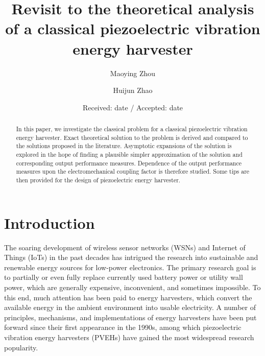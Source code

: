 \documentclass{svjour3}                     %
\begin{document}
\title{Revisit to the theoretical analysis of a classical piezoelectric vibration energy harvester }

\author{Maoying Zhou         \and
        Huijun Zhao %
}



\date{Received: date / Accepted: date}


\maketitle

\begin{abstract}
In this paper, we investigate the classical problem for a classical piezoelectric vibration energy harvester. Exact theoretical solution to the problem is derived and compared to the solutions proposed in the literature. Asymptotic expansions of the solution is explored in the hope of finding a plausible simpler approximation of the solution and corresponding output performance measures. Dependence of the output performance measures upon the electromechanical coupling factor is therefore studied. Some tips are then provided for the design of piezoelectric energy harvester.

\end{abstract}

\section{Introduction}

The soaring development of wireless sensor networks (WSNs) and Internet of Things (IoTs) in the past decades has intrigued the research into sustainable and renewable energy sources for low-power electronics. The primary research goal is to partially or even fully replace currently used battery power or utility wall power, which are generally expensive, inconvenient, and sometimes impossible. To this end, much attention has been paid to energy harvesters, which convert the available energy in the ambient environment into usable electricity. A number of principles, mechanisms, and implementations of energy harvesters have been put forward since their first appearance in the 1990s, \cite{beeby2006energy,anton2007review,zhou2018review,safaei2019review} among which piezoelectric vibration energy harvesters (PVEHs) have gained the most widespread research popularity. 
\end{document}
